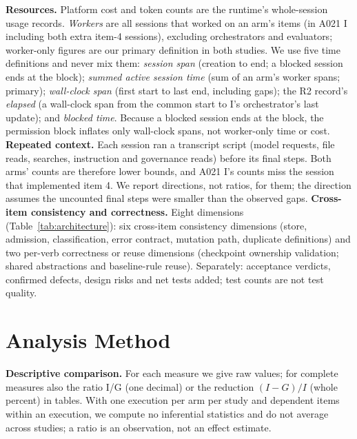 \documentclass[10pt,conference]{IEEEtran}
\newcommand{\I}{I}
\begin{document}
\textbf{Resources.} Platform cost and token counts are the runtime's whole-session usage records. \emph{Workers} are all sessions that worked on an arm's items (in A021 \I{} including both extra item-4 sessions), excluding orchestrators and evaluators; worker-only figures are our primary definition in both studies. %
We use five time definitions and never mix them: \emph{session span} (creation to end; a blocked session ends at the block); \emph{summed active session time} (sum of an arm's worker spans; primary); \emph{wall-clock span} (first start to last end, including gaps); the R2 record's \emph{elapsed} (a wall-clock span from the common start to \I's orchestrator's last update); and \emph{blocked time}. Because a blocked session ends at the block, the permission block inflates only wall-clock spans, not worker-only time or cost. %
\textbf{Repeated context.} Each session ran a transcript script (model requests, file reads, searches, instruction and governance reads) before its final steps. Both arms' counts are therefore lower bounds, and A021 \I's counts miss the session that implemented item 4. We report directions, not ratios, for them; the direction assumes the uncounted final steps were smaller than the observed gaps. %
\textbf{Cross-item consistency and correctness.} Eight dimensions (Table~\ref{tab:architecture}): six cross-item consistency dimensions (store, admission, classification, error contract, mutation path, duplicate definitions) and two per-verb correctness or reuse dimensions (checkpoint ownership validation; shared abstractions and baseline-rule reuse). Separately: acceptance verdicts, confirmed defects, design risks and net tests added; test counts are not test quality.

\section{Analysis Method}\label{sec:analysis}

\textbf{Descriptive comparison.} For each measure we give raw values; for complete measures also the ratio I/G (one decimal) or the reduction $(I-G)/I$ (whole percent) in tables. With one execution per arm per study and dependent items within an execution, we compute no inferential statistics and do not average across studies; a ratio is an observation, not an effect estimate.
\end{document}
